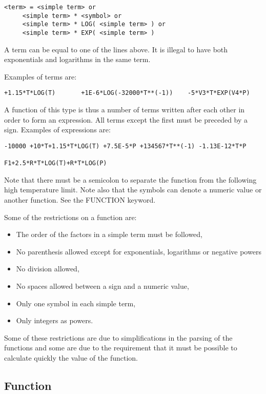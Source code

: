 \documentclass[12pt]{article}
\begin{document}
\begin{verbatim}
<term> = <simple term> or
	 <simple term> * <symbol> or
	 <simple term> * LOG( <simple term> ) or
	 <simple term> * EXP( <simple term> )
\end{verbatim}

A term can be equal to one of the lines above. It is illegal to have
both exponentials and logarithms in the same term.

Examples of terms are:

\begin{verbatim}
+1.15*T*LOG(T)       +1E-6*LOG(-32000*T**(-1))    -5*V3*T*EXP(V4*P)
\end{verbatim}

A function of this type is thus a number of terms written after
each other in order to form an expression. All terms except the first
must be preceded by a sign. Examples of expressions are:

\begin{verbatim}
-10000 +10*T+1.15*T*LOG(T) +7.5E-5*P +134567*T**(-1) -1.13E-12*T*P

F1+2.5*R*T*LOG(T)+R*T*LOG(P)
\end{verbatim}

Note that there must be a semicolon to separate the function from the
following high temperature limit. Note also that the symbols can
denote a numeric value or another function. See the FUNCTION
keyword.

Some of the restrictions on a function are:                 
\begin{itemize}
\item The order of the factors in a simple term must be followed,
\item No parenthesis allowed except for exponentials, logarithms or negative powers
\item No division allowed,                                             
\item No spaces allowed between a sign and a numeric value,            
\item Only one symbol in each simple term,                             
\item Only integers as powers.
\end{itemize}

Some of these restrictions are due to simplifications in the parsing
of the functions and some are due to the requirement that it must be
possible to calculate quickly the value of the function.

\subsection{Function}
\end{document}
